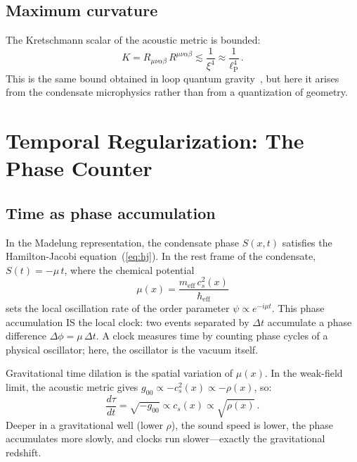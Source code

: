 \documentclass[12pt, a4paper]{article}
\newcommand{\meff}{m_{\mathrm{eff}}}
\newcommand{\heff}{\hbar_{\mathrm{eff}}}
\newcommand{\lP}{\ell_{\mathrm{P}}}
\begin{document}
\subsection{Maximum curvature}

The Kretschmann scalar of the acoustic metric is
bounded:
\begin{equation}
    K = R_{\mu\nu\alpha\beta}\,R^{\mu\nu\alpha\beta}
    \lesssim \frac{1}{\xi^4} \approx \frac{1}{\lP^4}\,.
\label{eq:Kretschmann}
\end{equation}
This is the same bound obtained in loop quantum
gravity~\cite{rovelli_2004}, but here it arises from
the condensate microphysics rather than from a
quantization of geometry.


\section{Temporal Regularization: The Phase Counter}
\label{sec:temporal}

\subsection{Time as phase accumulation}

In the Madelung representation, the condensate phase
$S(x,t)$ satisfies the Hamilton-Jacobi
equation~(\ref{eq:hj}). In the rest frame of the
condensate, $S(t) = -\mu\,t$, where the chemical
potential
\begin{equation}
    \mu(x) = \frac{\meff\,c_s^2(x)}{\heff}
\label{eq:mu}
\end{equation}
sets the local oscillation rate of the order parameter
$\psi \propto e^{-i\mu t}$. This phase accumulation IS
the local clock: two events separated by $\Delta t$
accumulate a phase difference $\Delta\phi = \mu\,\Delta t$.
A clock measures time by counting phase cycles of a
physical oscillator; here, the oscillator is the vacuum
itself.

Gravitational time dilation is the spatial variation
of $\mu(x)$. In the weak-field limit, the acoustic
metric gives $g_{00} \propto -c_s^2(x) \propto
-\rho(x)$, so:
\begin{equation}
    \frac{d\tau}{dt} = \sqrt{-g_{00}}
    \propto c_s(x) \propto \sqrt{\rho(x)}\,.
\label{eq:time_dilation}
\end{equation}
Deeper in a gravitational well (lower $\rho$), the
sound speed is lower, the phase accumulates more
slowly, and clocks run slower---exactly the
gravitational redshift.
\end{document}
